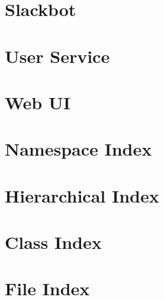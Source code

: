\documentclass[twoside]{book}
\newcommand{\+}{\discretionary{\mbox{\scriptsize$\hookleftarrow$}}{}{}}
\begin{document}
\chapter{Slackbot}
\label{md_slackbot-service__r_e_a_d_m_e}

\chapter{User Service}
\label{md_user-service__r_e_a_d_m_e}

\chapter{Web UI}
\label{md_web-ui__r_e_a_d_m_e}

\chapter{Namespace Index}

\chapter{Hierarchical Index}

\chapter{Class Index}

\chapter{File Index}

\end{document}
